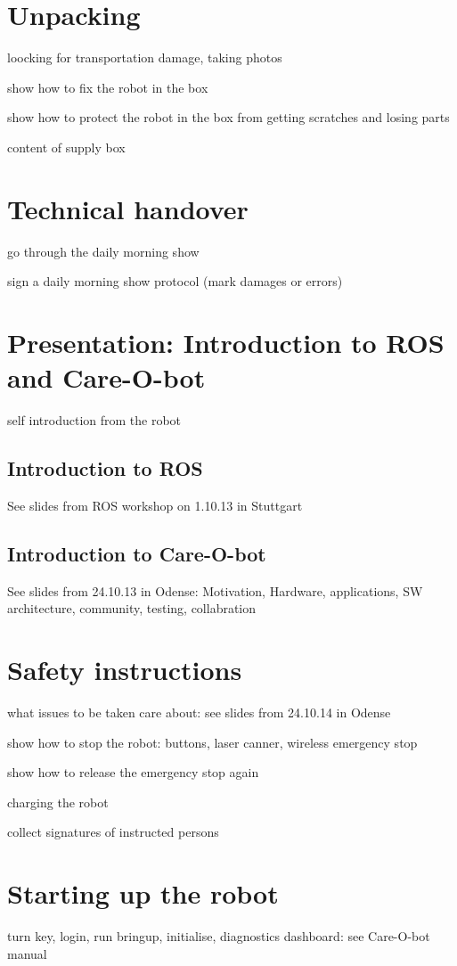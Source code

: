 \documentclass[12pt,twoside]{report}
\begin{document}
\section{Unpacking}
loocking for transportation damage, taking photos

show how to fix the robot in the box

show how to protect the robot in the box from getting scratches and losing parts

content of supply box

\section{Technical handover}
go through the daily morning show

sign a daily morning show protocol (mark damages or errors)

\section{Presentation: Introduction to ROS and Care-O-bot}
self introduction from the robot

\subsection{Introduction to ROS}
See slides from ROS workshop on 1.10.13 in Stuttgart
\subsection{Introduction to Care-O-bot}
See slides from 24.10.13 in Odense: Motivation, Hardware, applications, SW architecture, community, testing, collabration

\section{Safety instructions}
what issues to be taken care about: see slides from 24.10.14 in Odense

show how to stop the robot: buttons, laser canner, wireless emergency stop

show how to release the emergency stop again

charging the robot

collect signatures of instructed persons

\section{Starting up the robot}
turn key, login, run bringup, initialise, diagnostics dashboard: see Care-O-bot manual
\end{document}
